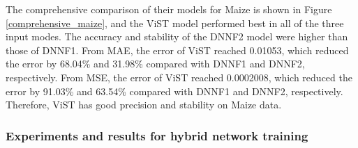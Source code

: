 \documentclass[acmsmall,manuscript, screen, review]{acmart}
\begin{document}
The comprehensive comparison of their models for Maize is shown in Figure \ref{comprehensive_maize}, and the ViST model performed best in all of the three input modes. The accuracy and stability of the DNNF2 model were higher than those of DNNF1. From  MAE, the error of ViST reached 0.01053, which reduced the error by 68.04\% and 31.98\% compared with DNNF1 and DNNF2, respectively. From MSE, the error of ViST reached 0.0002008, which reduced the error by 91.03\% and 63.54\% compared with DNNF1 and DNNF2, respectively. Therefore, ViST has good precision and stability on Maize data.

\subsubsection{Experiments and results for hybrid network training}
\end{document}

